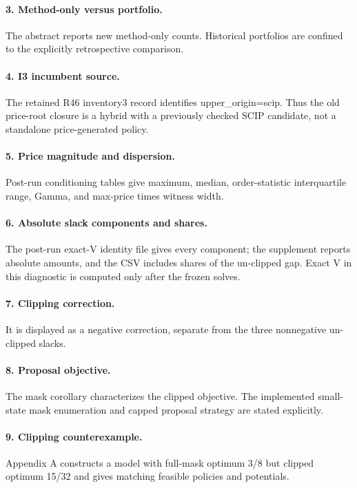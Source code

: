 \paragraph{3. Method-only versus portfolio.} The abstract reports new method-only counts. Historical portfolios are confined to the explicitly retrospective comparison.

\paragraph{4. I3 incumbent source.} The retained R46 inventory3 record identifies upper\_origin=scip. Thus the old price-root closure is a hybrid with a previously checked SCIP candidate, not a standalone price-generated policy.

\paragraph{5. Price magnitude and dispersion.} Post-run conditioning tables give maximum, median, order-statistic interquartile range, Gamma, and max-price times witness width.

\paragraph{6. Absolute slack components and shares.} The post-run exact-V identity file gives every component; the supplement reports absolute amounts, and the CSV includes shares of the un-clipped gap. Exact V in this diagnostic is computed only after the frozen solves.

\paragraph{7. Clipping correction.} It is displayed as a negative correction, separate from the three nonnegative un-clipped slacks.

\paragraph{8. Proposal objective.} The mask corollary characterizes the clipped objective. The implemented small-state mask enumeration and capped proposal strategy are stated explicitly.

\paragraph{9. Clipping counterexample.} Appendix A constructs a model with full-mask optimum 3/8 but clipped optimum 15/32 and gives matching feasible policies and potentials.

